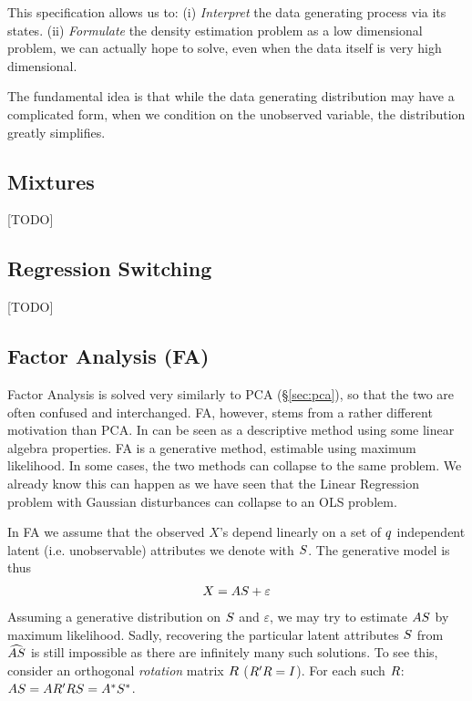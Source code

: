 This specification allows us to:
(i) \emph{Interpret} the data generating process via its states. 
(ii) \emph{Formulate} the density estimation problem as a low dimensional problem, we can actually hope to solve, even when the data itself is very high dimensional.

The fundamental idea is that while the data generating distribution may have a complicated form, when we condition on the unobserved variable, the distribution greatly simplifies. 


\subsection{Mixtures}
[TODO]


\subsection{Regression Switching}
[TODO]



\subsection{Factor Analysis (FA)}
\label{sec:factor_analysis}

Factor Analysis is solved very similarly to PCA (\S\ref{sec:pca}), so that the two are often confused and interchanged. 
FA, however, stems from a rather different motivation than PCA.
In can be seen as a descriptive method using some linear algebra properties.
FA is a generative method, estimable using maximum likelihood. In some cases, the two methods can collapse to the same problem. 
We already know this can happen as we have seen that the Linear Regression problem with Gaussian disturbances can collapse to an OLS problem. 

In FA we assume that the observed $X$'s depend linearly on a set of $q$ independent latent (i.e. unobservable) attributes we denote with $S$.
The generative model is thus
\begin{align}
\label{eq:factor}
	X=A S+\varepsilon
\end{align}
Assuming a generative distribution on $S$ and $\varepsilon$, we may try to estimate $A S$ by maximum likelihood.
Sadly, recovering the particular latent attributes $S$ from $\widehat{AS}$ is still impossible as there are infinitely many such solutions. To see this, consider an orthogonal \emph{rotation} matrix $R$ ($R' R=I$). For each such $R$: $ A S=A R' R S = A^* S^*$.

